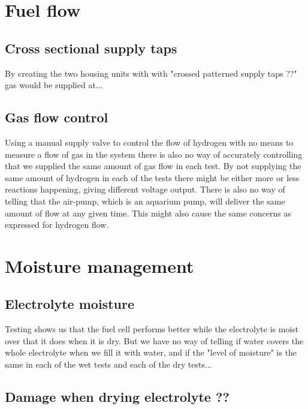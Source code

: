 \section{Fuel flow}
\subsection{Cross sectional supply taps}

By creating the two housing units with with "crossed patterned supply taps ??" gas would be supplied at...

\subsection{Gas flow control}

Using a manual supply valve to control the flow of hydrogen with no means to measure a flow of gas in the system there is also no way of accurately controlling that we supplied the same amount of gas flow in each test. By not supplying the same amount of hydrogen in each of the tests there might be either more or less reactions happening, giving different voltage output. There is also no way of telling that the air-pump, which is an aquarium pump, will deliver the same amount of flow at any given time. This might also cause the same concerns as expressed for hydrogen flow.

\section{Moisture management}
\subsection{Electrolyte moisture}
Testing shows us that the fuel cell performs better while the electrolyte is moist over that it does when it is dry. But we have no way of telling if water covers the whole electrolyte when we fill it with water, and if the "level of moisture" is the same in each of the wet tests and each of the dry tests...

\subsection{Damage when drying electrolyte ??}







